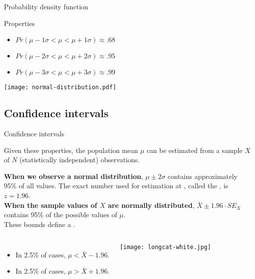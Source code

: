 \documentclass[t]{beamer}
\begin{document}
	\begin{frame}[t]{Probability density function}
	
	\begin{block}{Properties}	
		\begin{itemize}
			\item $Pr(\mu - 1\sigma < \mu < \mu + 1\sigma) \approx .68$
			\item $Pr(\mu - 2\sigma < \mu < \mu + 2\sigma) \approx .95$
			\item $Pr(\mu - 3\sigma < \mu < \mu + 3\sigma) \approx .99$
		\end{itemize}
	\end{block}
	
	\begin{center}
		\texttt{[image: normal-distribution.pdf]}
	\end{center}
		
	\end{frame}

	\subsection{Confidence intervals}
	\begin{frame}[t]{Confidence intervals}

	Given these properties, the population mean $\mu$ can be estimated from a sample $X$ of $N$ (statistically independent) observations.\vspace{1em}

		\textbf{When we observe a normal distribution}, $\mu \pm 2\sigma$ contains approximately 95\% of all values. The exact number used for estimation at , called the , is $z = 1.96$.\\
		\vspace{1em}
\textbf{When the sample values of $X$ are normally distributed}, $\bar X \pm 1.96 \cdot SE_{\bar X}$ contains 95\% of the possible values of $\mu$.\\[1em]

These bounds define a .


	\begin{columns}[T]
		\hspace{.725em}
		\begin{itemize}
			\item In 2.5\% of cases, $\mu < \bar{X} - 1.96$.
			\item In 2.5\% of cases, $\mu > \bar{X} + 1.96$.
		\end{itemize}
		\vspace{-4em}
		\begin{flushright}
		\texttt{[image: longcat-white.jpg]}		
		\end{flushright}
	\end{columns}
	
	\end{frame}
\end{document}
